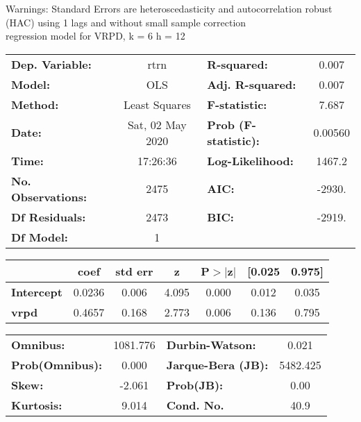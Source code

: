 Warnings: \newline
 [1] Standard Errors are heteroscedasticity and autocorrelation robust (HAC) using 1 lags and without small sample correction\\ 

regression model for VRPD, k = 6 h = 12\begin{center}
\begin{tabular}{lclc}
\toprule
\textbf{Dep. Variable:}    &       rtrn       & \textbf{  R-squared:         } &     0.007   \\
\textbf{Model:}            &       OLS        & \textbf{  Adj. R-squared:    } &     0.007   \\
\textbf{Method:}           &  Least Squares   & \textbf{  F-statistic:       } &     7.687   \\
\textbf{Date:}             & Sat, 02 May 2020 & \textbf{  Prob (F-statistic):} &  0.00560    \\
\textbf{Time:}             &     17:26:36     & \textbf{  Log-Likelihood:    } &    1467.2   \\
\textbf{No. Observations:} &        2475      & \textbf{  AIC:               } &    -2930.   \\
\textbf{Df Residuals:}     &        2473      & \textbf{  BIC:               } &    -2919.   \\
\textbf{Df Model:}         &           1      & \textbf{                     } &             \\
\bottomrule
\end{tabular}
\begin{tabular}{lcccccc}
                   & \textbf{coef} & \textbf{std err} & \textbf{z} & \textbf{P$> |$z$|$} & \textbf{[0.025} & \textbf{0.975]}  \\
\midrule
\textbf{Intercept} &       0.0236  &        0.006     &     4.095  &         0.000        &        0.012    &        0.035     \\
\textbf{vrpd}      &       0.4657  &        0.168     &     2.773  &         0.006        &        0.136    &        0.795     \\
\bottomrule
\end{tabular}
\begin{tabular}{lclc}
\textbf{Omnibus:}       & 1081.776 & \textbf{  Durbin-Watson:     } &    0.021  \\
\textbf{Prob(Omnibus):} &   0.000  & \textbf{  Jarque-Bera (JB):  } & 5482.425  \\
\textbf{Skew:}          &  -2.061  & \textbf{  Prob(JB):          } &     0.00  \\
\textbf{Kurtosis:}      &   9.014  & \textbf{  Cond. No.          } &     40.9  \\
\bottomrule
\end{tabular}
\end{center}

